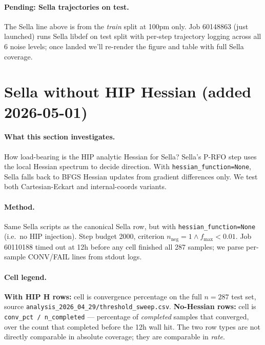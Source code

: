 \documentclass[11pt]{article}
\begin{document}
\paragraph{Pending: Sella trajectories on test.} The Sella line above
is from the \emph{train} split at 100pm only. Job 60148863 (just
launched) runs Sella libdef on test split with per-step trajectory
logging across all 6 noise levels; once landed we'll re-render the
figure and table with full Sella coverage.

\section{Sella without HIP Hessian (added 2026-05-01)}

\paragraph{What this section investigates.} How load-bearing is the
HIP analytic Hessian for Sella? Sella's P-RFO step uses the local Hessian
spectrum to decide direction. With \texttt{hessian\_function=None}, Sella
falls back to BFGS Hessian updates from gradient differences only. We
test both Cartesian-Eckart and internal-coords variants.

\paragraph{Method.} Same Sella scripts as the canonical Sella row, but
with \texttt{hessian\_function=None} (i.e.\ no HIP injection). Step
budget 2000, criterion $n_{\text{neg}}{=}1 \wedge f_{\max}{<}0.01$.
Job 60110188 timed out at 12h before any cell finished
all 287 samples; we parse per-sample CONV/FAIL lines from stdout logs.

\paragraph{Cell legend.}
\textbf{With HIP H rows:} cell is convergence percentage on the full
$n=287$ test set, source \texttt{analysis\_2026\_04\_29/threshold\_sweep.csv}.
\textbf{No-Hessian rows:} cell is \texttt{conv\_pct / n\_completed} —
percentage of \emph{completed} samples that converged, over the count
that completed before the 12h wall hit. The two row types are not
directly comparable in absolute coverage; they are comparable in
\emph{rate}.
\end{document}
